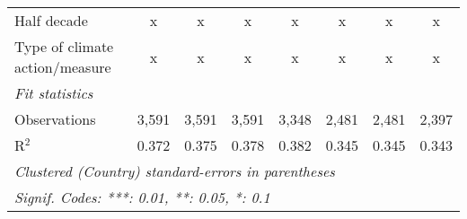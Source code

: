 \begin{tabular}{lccccccc}
   Half decade                                                                             & x              & x             & x             & x             & x            & x            & x\\  
   Type of climate action/measure                                                          & x              & x             & x             & x             & x            & x            & x\\  
   \midrule \emph{Fit statistics}\\
   Observations                                                                            & 3,591          & 3,591         & 3,591         & 3,348         & 2,481        & 2,481        & 2,397\\  
   R$^2$                                                                                   & 0.372          & 0.375         & 0.378         & 0.382         & 0.345        & 0.345        & 0.343\\  
   \midrule
   \multicolumn{8}{l}{\emph{Clustered (Country) standard-errors in parentheses}}\\
   \multicolumn{8}{l}{\emph{Signif. Codes: ***: 0.01, **: 0.05, *: 0.1}}\\
\end{tabular}
\par\endgroup


